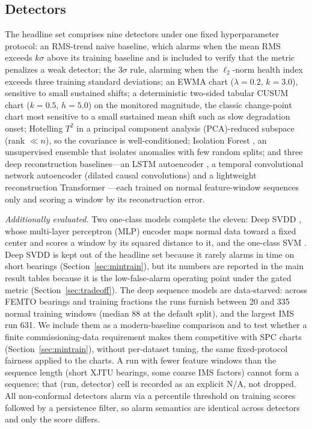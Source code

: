 \documentclass[IJPHM, 2026, 0]{PHMSociety}
\begin{document}
\subsection{Detectors}
\label{sec:detectors}
The headline set comprises nine detectors under one fixed hyperparameter protocol: an RMS-trend naive baseline, which alarms when the mean RMS exceeds $k\sigma$ above its training baseline and is included to verify that the metric penalizes a weak detector; the $3\sigma$ rule, alarming when the $\ell_2$-norm health index exceeds three training standard deviations; an EWMA chart \cite{roberts1959control} ($\lambda=0.2$, $k=3.0$), sensitive to small sustained shifts; a deterministic two-sided tabular CUSUM chart \cite{page1954continuous} ($k=0.5$, $h=5.0$) on the monitored magnitude, the classic change-point chart most sensitive to a small sustained mean shift such as slow degradation onset; Hotelling $T^2$ \cite{hotelling1947multivariate} in a principal component analysis (PCA)-reduced subspace (rank $\ll n$), so the covariance is well-conditioned; Isolation Forest \cite{liu2008isolation}, an unsupervised ensemble that isolates anomalies with few random splits; and three deep reconstruction baselines---an LSTM autoencoder \cite{malhotra2016lstm}, a temporal convolutional network autoencoder (dilated causal convolutions) and a lightweight reconstruction Transformer \cite{vaswani2017attention}---each trained on normal feature-window sequences only and scoring a window by its reconstruction error.

\emph{Additionally evaluated.} Two one-class models complete the eleven: Deep SVDD \cite{ruff2018deep}, whose multi-layer perceptron (MLP) encoder maps normal data toward a fixed center and scores a window by its squared distance to it, and the one-class SVM \cite{scholkopf2001estimating}. Deep SVDD is kept out of the headline set because it rarely alarms in time on short bearings (Section~\ref{sec:mintrain}), but its numbers are reported in the main result tables because it is the low-false-alarm operating point under the gated metric (Section~\ref{sec:tradeoff}). The deep sequence models are data-starved: across FEMTO bearings and training fractions the runs furnish between 20 and 335 normal training windows (median 88 at the default split), and the largest IMS run 631. We include them as a modern-baseline comparison and to test whether a finite commissioning-data requirement makes them competitive with SPC charts (Section~\ref{sec:mintrain}), without per-dataset tuning, the same fixed-protocol fairness applied to the charts. A run with fewer feature windows than the sequence length (short XJTU bearings, some coarse IMS factors) cannot form a sequence; that (run, detector) cell is recorded as an explicit N/A, not dropped. All non-conformal detectors alarm via a percentile threshold on training scores followed by a persistence filter, so alarm semantics are identical across detectors and only the score differs.
\end{document}

